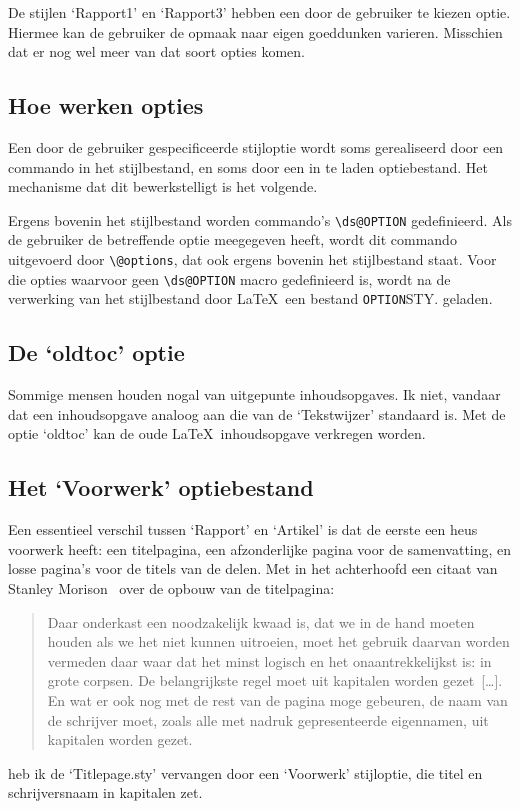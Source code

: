 \documentclass[oldtoc,a4paper,10pt]{rapport3}
\begin{document}
De stijlen `Rapport1' en `Rapport3' hebben een door de gebruiker te
kiezen optie.  Hiermee kan de gebruiker de opmaak naar eigen
goeddunken varieren.  Misschien dat er nog wel meer van dat soort
opties komen.
 
 
\subsection{Hoe werken opties}
Een door de gebruiker gespecificeerde stijloptie wordt soms
gerealiseerd door een commando in het stijlbestand, en soms door een
in te laden optiebestand.  Het mechanisme dat dit bewerkstelligt is
het volgende.
 
Ergens bovenin het stijlbestand worden commando's \verb.\ds@OPTION.
gedefinieerd. Als de gebruiker de betreffende optie meegegeven heeft,
wordt dit commando uitgevoerd door \verb.\@options., dat ook ergens
bovenin het stijlbestand staat.  Voor die opties waarvoor geen
\verb.\ds@OPTION. macro gedefinieerd is, wordt na de verwerking van
het stijlbestand door \LaTeX\ een bestand \verb.OPTION.STY. geladen.
 
\subsection{De `oldtoc' optie}
Sommige mensen houden nogal van uitgepunte inhoudsopgaves.  Ik niet,
vandaar dat een inhoudsopgave analoog aan die van de `Tekstwijzer'
standaard is.  Met de optie `oldtoc' kan de oude \LaTeX\ inhoudsopgave
verkregen worden.
 
 
\subsection{Het `Voorwerk' optiebestand}
Een essentieel verschil tussen `Rapport' en `Artikel' is dat de eerste
een heus voorwerk heeft: een titelpagina, een afzonderlijke pagina
voor de samenvatting, en losse pagina's voor de titels van de delen.
Met in het achterhoofd een citaat van Stanley Morison~\cite{Morison}
over de opbouw van de titelpagina:
\begin{quotation}
  Daar onderkast een noodzakelijk kwaad is, dat we in de hand moeten
  houden als we het niet kunnen uitroeien, moet het gebruik daarvan
  worden vermeden daar waar dat het minst logisch en het
  onaantrekkelijkst is: in grote corpsen. De belangrijkste regel moet
  uit kapitalen worden gezet~[\dots]. En wat er ook nog met de rest
  van de pagina moge gebeuren, de naam van de schrijver moet, zoals
  alle met nadruk gepresenteerde eigennamen, uit kapitalen worden
  gezet.
\end{quotation}
heb ik de `Titlepage.sty' vervangen door een `Voorwerk' stijloptie,
die titel en schrijversnaam in kapitalen zet.
 
\end{document}
